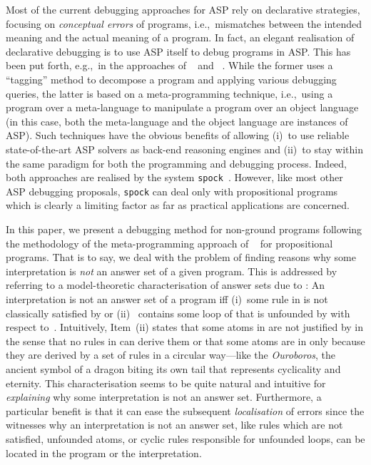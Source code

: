 \documentclass{tlp}
\newcommand{\wrt}{with respect to}
\newcommand{\iec}{i.e.,\ }
\newcommand{\egc}{e.g.,\ }
\begin{document}
Most of the current debugging approaches for ASP rely on declarative strategies, focusing on \emph{conceptual errors} of programs, \iec mismatches between the intended meaning and the actual meaning of a program.
In fact, an elegant realisation of declarative debugging is to use ASP itself to debug  programs in ASP. This has been put forth, \egc in the approaches of ~\citeyear{brain07} and ~\citeyear{gebser08}.
While the former uses a ``tagging'' method to decompose a program and applying various debugging queries, the latter is based on a meta-programming technique, \iec using a program over a meta-language to manipulate a program over an object language (in this case, both the meta-language and the object language are instances of ASP).
Such techniques have the obvious benefits of allowing (i)~to use reliable state-of-the-art ASP solvers as back-end reasoning engines and (ii)~to stay within the same paradigm for both the programming and debugging process.
Indeed, both approaches are realised by the system \texttt{spock}~\cite{spock07}.
However, like most other ASP debugging proposals, \texttt{spock} can deal only with propositional programs which is clearly a limiting factor as far as practical applications are concerned.

In this paper, we present a debugging method for non-ground programs following the methodology of the meta-programming approach of ~\citeyear{gebser08} for propositional programs.
That is to say, we deal with the problem of finding reasons why some interpretation is \emph{not} an answer set of a given program.
This is addressed by referring to a model-theoretic
characterisation of answer sets due to  \citeyear{lee05}:
An interpretation  is not an answer set of a 
program  iff
(i)~some rule in  is not classically satisfied by  or
(ii)~ contains some loop of  that is unfounded by   \wrt\ .
Intuitively,  Item~(ii) states that some atoms in  are not justified by  in the  sense that
no rules in  can derive them or that some atoms are in  only because they are derived by a set of rules in a  circular way---like the \emph{Ouroboros}, the ancient symbol of a dragon biting its own tail that represents cyclicality and eternity.
This characterisation seems to be quite natural and intuitive for \emph{explaining}
why some interpretation is not an answer set. 
Furthermore, a particular 
benefit is that it can ease the subsequent  \emph{localisation} of errors
since the witnesses why an interpretation is not an answer set, like
rules which are not satisfied, unfounded atoms,  or cyclic rules  responsible for unfounded loops,
can be located in the program or the interpretation.
\end{document}
